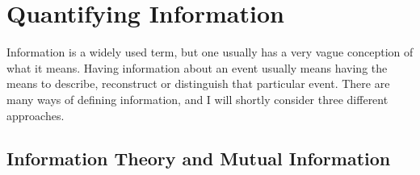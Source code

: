 
\section{Quantifying Information}

Information is a widely used term, but one usually has a very vague conception of what it means. Having information about an event usually means
having the means to describe, reconstruct or distinguish that particular event. There are many ways of defining information, and I will shortly consider three different
approaches.

\subsection{Information Theory and Mutual Information}


